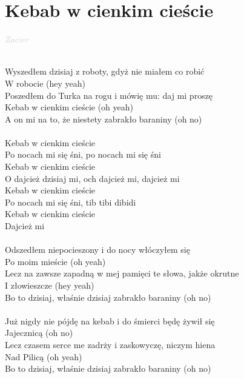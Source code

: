 \documentclass[a5paper, 10pt]{book}
\begin{document}
\newpage
\section{Kebab w cienkim cieście}\textcolor{lightgray}{\textit{Zacier}}\\~\\
\begin{minipage}[t]{0.8\textwidth}
  Wyszedłem dzisiaj z roboty, gdyż nie miałem co robić\\
  W robocie (hey yeah)\\
  Poszedłem do Turka na rogu i mówię mu: daj mi proszę\\
  Kebab w cienkim cieście (oh yeah)\\
  A on mi na to, że niestety zabrakło baraniny (oh no)\\
  \\
  \hspace*{5mm}Kebab w cienkim cieście\\
  \hspace*{5mm}Po nocach mi się śni, po nocach mi się śni\\
  \hspace*{5mm}Kebab w cienkim cieście\\
  \hspace*{5mm}O dajcież dzisiaj mi, och dajcież mi, dajcież mi\\

  \hspace*{5mm}Kebab w cienkim cieście\\
  \hspace*{5mm}Po nocach mi się śni, tib tibi dibidi\\
  \hspace*{5mm}Kebab w cienkim cieście\\
  \hspace*{5mm}Dajcież mi\\
  \\
  Odszedłem niepocieszony i do nocy włóczyłem się\\
  Po moim mieście (oh yeah)\\
  Lecz na zawsze zapadną w mej pamięci te słowa, jakże okrutne\\
  I złowieszcze (hey yeah)\\
  Bo to dzisiaj, właśnie dzisiaj zabrakło baraniny (oh no)\\
  \\
  Już nigdy nie pójdę na kebab i do śmierci będę żywił się\\
  Jajecznicą (oh no)\\
  Lecz czasem serce me zadrży i zaskowyczę, niczym hiena\\
  Nad Pilicą (oh yeah)\\
  Bo to dzisiaj, właśnie dzisiaj zabrakło baraniny (oh no)\\
\end{minipage}
\end{document}
